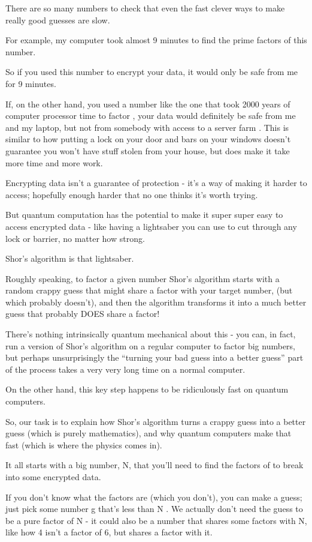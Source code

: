 \documentclass[../main.tex]{subfiles}
\begin{document}
There are so many numbers to check that even the fast clever ways to make really good guesses are slow.

For example, my computer took almost 9 minutes to find the prime factors of this number.

So if you used this number to encrypt your data, it would only be safe from me for 9 minutes.

If, on the other hand, you used a number like the one that took 2000 years of computer processor time to factor , your data would definitely be safe from me and my laptop, but not from somebody with access to a server farm . This is similar to how putting a lock on your door and bars on your windows doesn’t guarantee you won’t have stuff stolen from your house, but does make it take more time and more work.

Encrypting data isn’t a guarantee of protection - it’s a way of making it harder to access; hopefully enough harder that no one thinks it’s worth trying.

But quantum computation has the potential to make it super super easy to access encrypted data - like having a lightsaber you can use to cut through any lock or barrier, no matter how strong.

Shor’s algorithm is that lightsaber.

Roughly speaking, to factor a given number Shor’s algorithm starts with a random crappy guess that might share a factor with your target number, (but which probably doesn’t), and then the algorithm transforms it into a much better guess that probably DOES share a factor!

There’s nothing intrinsically quantum mechanical about this - you can, in fact, run a version of Shor’s algorithm on a regular computer to factor big numbers, but perhaps unsurprisingly the “turning your bad guess into a better guess” part of the process takes a very very long time on a normal computer.

On the other hand, this key step happens to be ridiculously fast on quantum computers.

So, our task is to explain how Shor’s algorithm turns a crappy guess into a better guess (which is purely mathematics), and why quantum computers make that fast (which is where the physics comes in).

It all starts with a big number, N, that you’ll need to find the factors of to break into some encrypted data.

If you don’t know what the factors are (which you don’t), you can make a guess; just pick some number g that’s less than N . We actually don’t need the guess to be a pure factor of N - it could also be a number that shares some factors with N, like how 4 isn’t a factor of 6, but shares a factor with it.
\end{document}
